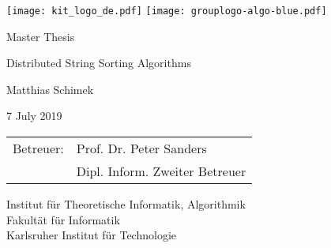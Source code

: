 \documentclass[12pt,a4paper,twoside]{scrartcl}
\numberwithin{equation}{section}
\begin{document}

\pagestyle{empty} %

\begin{titlepage}

  \begin{center}\large

    \quad\texttt{[image: kit\_logo\_de.pdf]} \hfill
    \texttt{[image: grouplogo-algo-blue.pdf]}\quad\null

    \vfill

    Master Thesis
    \vspace*{2cm}

    {\huge Distributed String Sorting Algorithms \par}

    \vfill

    Matthias Schimek

    \vspace*{15mm}

    7 July 2019

    \vspace*{45mm}

    \begin{tabular}{rl}
      Betreuer: & Prof. Dr. Peter Sanders \\
      & Dipl. Inform. Zweiter Betreuer \\
    \end{tabular}
    
    \vspace*{10mm}

    Institut für Theoretische Informatik, Algorithmik \\
    Fakultät für Informatik \\
    Karlsruher Institut für Technologie


    \vspace*{12mm}
  \end{center}

\end{titlepage}
\end{document}
